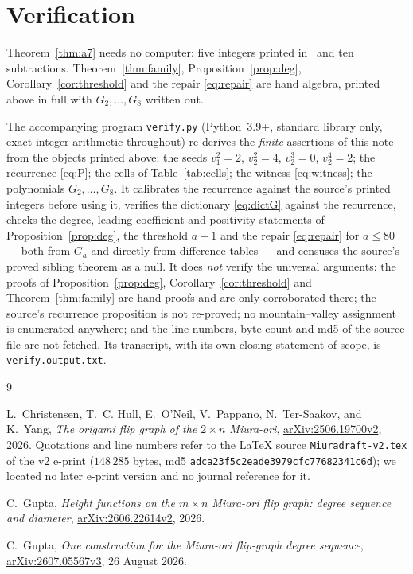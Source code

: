 \documentclass[11pt]{amsart}
\theoremstyle{remark}
\begin{document}
\section{Verification}

Theorem~\ref{thm:a7} needs no computer: five integers printed
in~\cite{CHOPTY} and ten subtractions.
Theorem~\ref{thm:family}, Proposition~\ref{prop:deg},
Corollary~\ref{cor:threshold} and the repair \eqref{eq:repair} are hand algebra,
printed above in full with $G_2,\dots,G_8$ written out.

The accompanying program \texttt{verify.py} (Python~3.9+, standard library only,
exact integer arithmetic throughout) re-derives the \emph{finite} assertions of
this note from the objects printed above: the seeds $v_1^2=2$, $v_2^2=4$,
$v_2^3=0$, $v_2^4=2$; the recurrence \eqref{eq:P}; the cells of
Table~\ref{tab:cells}; the witness \eqref{eq:witness}; the polynomials
$G_2,\dots,G_8$. It calibrates the recurrence against the source's printed
integers before using it, verifies the dictionary \eqref{eq:dictG} against the
recurrence, checks the degree, leading-coefficient and positivity statements of
Proposition~\ref{prop:deg}, the threshold $a-1$ and the repair
\eqref{eq:repair} for $a\le80$ --- both from $G_a$ and directly from difference
tables --- and censuses the source's proved sibling theorem as a null. It does
\emph{not} verify the universal arguments: the proofs of
Proposition~\ref{prop:deg}, Corollary~\ref{cor:threshold} and
Theorem~\ref{thm:family} are hand proofs and are only corroborated there; the
source's recurrence proposition is not re-proved; no mountain--valley assignment
is enumerated anywhere; and the line numbers, byte count and md5 of the source
file are not fetched. Its transcript, with its own closing statement of scope,
is \texttt{verify.output.txt}.

\begin{thebibliography}{9}

L.~Christensen, T.~C. Hull, E.~O'Neil, V.~Pappano, N.~Ter-Saakov, and K.~Yang,
\emph{The origami flip graph of the $2\times n$ Miura-ori},
\href{https://arxiv.org/abs/2506.19700v2}{arXiv:2506.19700v2}, 2026.
Quotations and line numbers refer to the \LaTeX{} source
\texttt{Miuradraft-v2.tex} of the v2 e-print ($148\,285$ bytes, md5
\texttt{adca23f5c2eade3979cfc77682341c6d}); we located no later e-print version
and no journal reference for it.

C.~Gupta,
\emph{Height functions on the $m\times n$ Miura-ori flip graph: degree sequence
and diameter},
\href{https://arxiv.org/abs/2606.22614}{arXiv:2606.22614v2}, 2026.

C.~Gupta,
\emph{One construction for the Miura-ori flip-graph degree sequence},
\href{https://arxiv.org/abs/2607.05567}{arXiv:2607.05567v3}, 26 August 2026.

\end{thebibliography}
\end{document}
